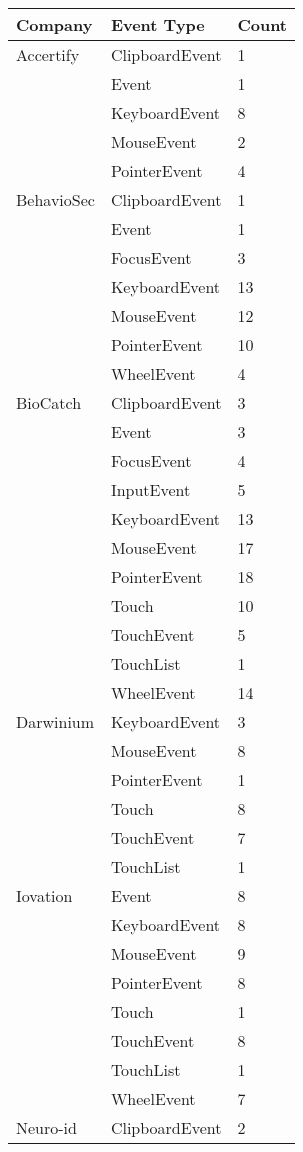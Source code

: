 \begin{table}[h]
\centering
\begin{tabular}{|l|l|l|}
\hline
Company & Event Type & Count \\
\hline
Accertify & ClipboardEvent & 1 \\
 & Event & 1 \\
 & KeyboardEvent & 8 \\
 & MouseEvent & 2 \\
 & PointerEvent & 4 \\
\hline
BehavioSec & ClipboardEvent & 1 \\
 & Event & 1 \\
 & FocusEvent & 3 \\
 & KeyboardEvent & 13 \\
 & MouseEvent & 12 \\
 & PointerEvent & 10 \\
 & WheelEvent & 4 \\
\hline
BioCatch & ClipboardEvent & 3 \\
 & Event & 3 \\
 & FocusEvent & 4 \\
 & InputEvent & 5 \\
 & KeyboardEvent & 13 \\
 & MouseEvent & 17 \\
 & PointerEvent & 18 \\
 & Touch & 10 \\
 & TouchEvent & 5 \\
 & TouchList & 1 \\
 & WheelEvent & 14 \\
\hline
Darwinium & KeyboardEvent & 3 \\
 & MouseEvent & 8 \\
 & PointerEvent & 1 \\
 & Touch & 8 \\
 & TouchEvent & 7 \\
 & TouchList & 1 \\
\hline
Iovation & Event & 8 \\
 & KeyboardEvent & 8 \\
 & MouseEvent & 9 \\
 & PointerEvent & 8 \\
 & Touch & 1 \\
 & TouchEvent & 8 \\
 & TouchList & 1 \\
 & WheelEvent & 7 \\
\hline
Neuro-id & ClipboardEvent & 2 \\

\end{tabular}
\end{table}
